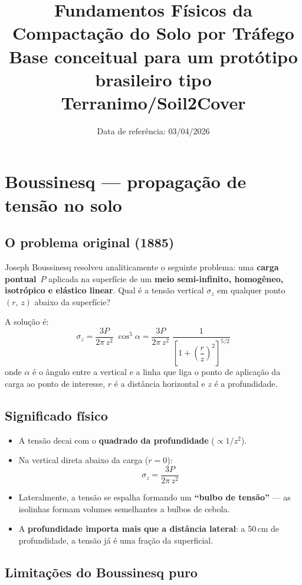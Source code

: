 \documentclass[12pt,a4paper]{article}
\title{Fundamentos Físicos da Compactação do Solo por Tráfego\\
\large Base conceitual para um protótipo brasileiro tipo Terranimo/Soil2Cover}
\author{}
\date{Data de referência: 03/04/2026}
\newcommand{\Section}[1]{\needspace{12\baselineskip}\section{#1}}
\newcommand{\Subsection}[1]{\needspace{10\baselineskip}\subsection{#1}}
\begin{document}
\maketitle
\vspace{-1.2em}

\Section{Boussinesq --- propagação de tensão no solo}

\Subsection{O problema original (1885)}

Joseph Boussinesq resolveu analiticamente o seguinte problema: uma \textbf{carga pontual}~$P$ aplicada na superfície de um \textbf{meio semi-infinito, homogêneo, isotrópico e elástico linear}. Qual é a tensão vertical $\sigma_z$ em qualquer ponto $(r,\,z)$ abaixo da superfície?

A solução é:
\begin{equation}
  \sigma_z
  = \frac{3P}{2\pi\, z^2}\;\cos^5\!\alpha
  = \frac{3P}{2\pi\, z^2}\;\frac{1}{\left[1 + \left(\dfrac{r}{z}\right)^{\!2}\right]^{5/2}}
  \label{eq:boussinesq}
\end{equation}
onde $\alpha$ é o ângulo entre a vertical e a linha que liga o ponto de aplicação da carga ao ponto de interesse, $r$ é a distância horizontal e $z$ é a profundidade.

\Subsection{Significado físico}

\begin{itemize}
  \item A tensão decai com o \textbf{quadrado da profundidade} ($\propto 1/z^2$).
  \item Na vertical direta abaixo da carga ($r=0$):
    \begin{equation}
      \sigma_z = \frac{3P}{2\pi\, z^2}
    \end{equation}
  \item Lateralmente, a tensão se espalha formando um \textbf{``bulbo de tensão''} --- as isolinhas formam volumes semelhantes a bulbos de cebola.
  \item A \textbf{profundidade importa mais que a distância lateral}: a 50\,cm de profundidade, a tensão já é uma fração da superficial.
\end{itemize}

\Subsection{Limitações do Boussinesq puro}
\end{document}
